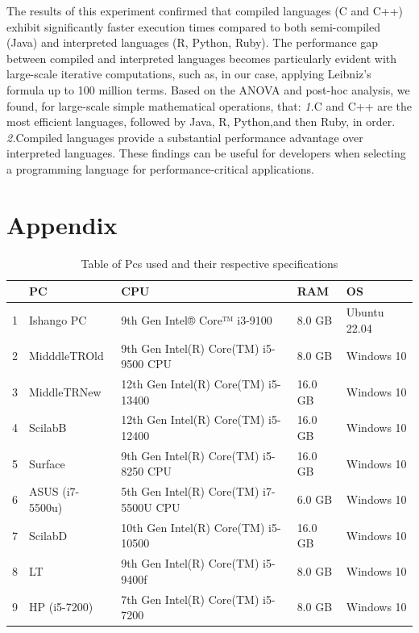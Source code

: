 \documentclass[12pt,halfline,a4paper,]{ouparticle}
\begin{document}
The results of this experiment confirmed that compiled languages (C and
C++) exhibit significantly faster execution times compared to both
semi-compiled (Java) and interpreted languages (R, Python, Ruby). The
performance gap between compiled and interpreted languages becomes
particularly evident with large-scale iterative computations, such as,
in our case, applying Leibniz's formula up to 100 million terms. Based
on the ANOVA and post-hoc analysis, we found, for large-scale simple
mathematical operations, that: \emph{1.}C and C++ are the most efficient
languages, followed by Java, R, Python,and then Ruby, in order.
\emph{2.}Compiled languages provide a substantial performance advantage
over interpreted languages. These findings can be useful for developers
when selecting a programming language for performance-critical
applications. \newpage

\section{Appendix}\label{appendix}

\begin{table}[ht]
\centering
\begin{tabular}{rllll}
  \hline
 & PC & CPU & RAM & OS \\ 
  \hline
1 & Ishango PC &  9th Gen Intel® Core™ i3-9100  &  8.0 GB  & Ubuntu 22.04 \\ 
  2 & MidddleTROld &  9th Gen Intel(R) Core(TM) i5-9500 CPU  &  8.0 GB  &   Windows 10 \\ 
  3 & MiddleTRNew  &  12th Gen Intel(R) Core(TM) i5-13400  &  16.0 GB  &   Windows 10 \\ 
  4 & ScilabB  &   12th Gen Intel(R) Core(TM) i5-12400  &   16.0 GB   &   Windows 10 \\ 
  5 & Surface  &   9th Gen Intel(R) Core(TM) i5-8250 CPU  &   16.0 GB   &   Windows 10 \\ 
  6 & ASUS (i7-5500u)  &   5th Gen Intel(R) Core(TM) i7-5500U CPU  &   6.0 GB   &   Windows 10 \\ 
  7 & ScilabD  &   10th Gen Intel(R) Core(TM) i5-10500  &   16.0 GB   &   Windows 10 \\ 
  8 & LT  &   9th Gen Intel(R) Core(TM) i5-9400f  &   8.0 GB   &   Windows 10 \\ 
  9 & HP (i5-7200)  &   7th Gen Intel(R) Core(TM) i5-7200  &   8.0 GB   &   Windows 10 \\ 
   \hline
\end{tabular}
\caption{Table of Pcs used and their respective specifications} 
\end{table}
\end{document}
